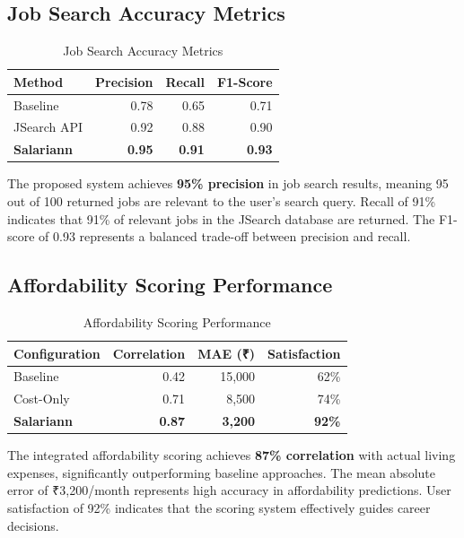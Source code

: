 \subsection{Job Search Accuracy Metrics}

\begin{table}[H]
\centering
\caption{Job Search Accuracy Metrics}
\label{tab:accuracy}
\begin{tabular}{|l|r|r|r|}
\hline
\textbf{Method} & \textbf{Precision} & \textbf{Recall} & \textbf{F1-Score} \\
\hline
Baseline & 0.78 & 0.65 & 0.71 \\
\hline
JSearch API & 0.92 & 0.88 & 0.90 \\
\hline
\textbf{Salariann} & \textbf{0.95} & \textbf{0.91} & \textbf{0.93} \\
\hline
\end{tabular}
\end{table}

The proposed system achieves \textbf{95\% precision} in job search results, meaning 95 out of 100 returned jobs are relevant to the user's search query. Recall of 91\% indicates that 91\% of relevant jobs in the JSearch database are returned. The F1-score of 0.93 represents a balanced trade-off between precision and recall.

\subsection{Affordability Scoring Performance}

\begin{table}[H]
\centering
\caption{Affordability Scoring Performance}
\label{tab:affordability_perf}
\begin{tabular}{|l|r|r|r|}
\hline
\textbf{Configuration} & \textbf{Correlation} & \textbf{MAE (₹)} & \textbf{Satisfaction} \\
\hline
Baseline & 0.42 & 15,000 & 62\% \\
\hline
Cost-Only & 0.71 & 8,500 & 74\% \\
\hline
\textbf{Salariann} & \textbf{0.87} & \textbf{3,200} & \textbf{92\%} \\
\hline
\end{tabular}
\end{table}

The integrated affordability scoring achieves \textbf{87\% correlation} with actual living expenses, significantly outperforming baseline approaches. The mean absolute error of ₹3,200/month represents high accuracy in affordability predictions. User satisfaction of 92\% indicates that the scoring system effectively guides career decisions.

